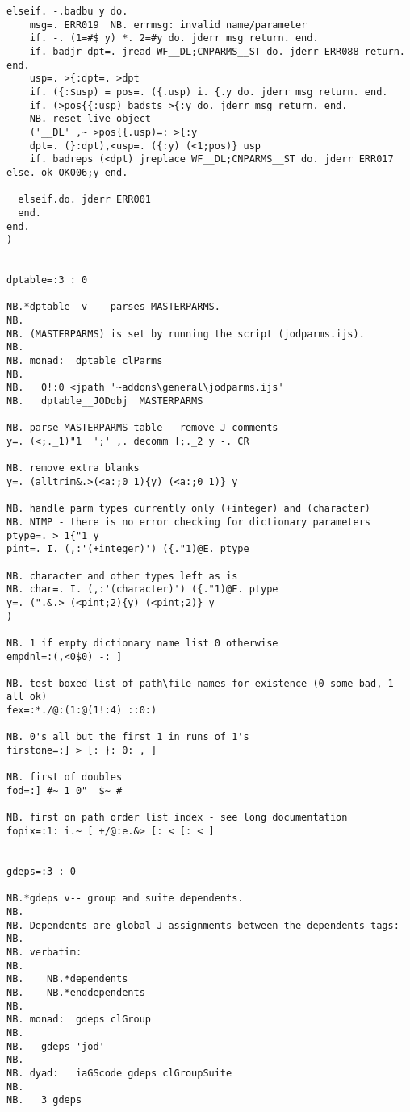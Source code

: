 \begin{lstlisting}[frame=single,framerule=0pt,basicstyle=\ttfamily\tiny]
  elseif. -.badbu y do.
    msg=. ERR019  NB. errmsg: invalid name/parameter
    if. -. (1=#$ y) *. 2=#y do. jderr msg return. end.
    if. badjr dpt=. jread WF__DL;CNPARMS__ST do. jderr ERR088 return. end.
    usp=. >{:dpt=. >dpt
    if. ({:$usp) = pos=. ({.usp) i. {.y do. jderr msg return. end.
    if. (>pos{{:usp) badsts >{:y do. jderr msg return. end.
    NB. reset live object
    ('__DL' ,~ >pos{{.usp)=: >{:y
    dpt=. (}:dpt),<usp=. ({:y) (<1;pos)} usp
    if. badreps (<dpt) jreplace WF__DL;CNPARMS__ST do. jderr ERR017 else. ok OK006;y end.

  elseif.do. jderr ERR001
  end.
end.
)


dptable=:3 : 0

NB.*dptable  v--  parses MASTERPARMS.
NB. 
NB. (MASTERPARMS) is set by running the script (jodparms.ijs).
NB.
NB. monad:  dptable clParms
NB.
NB.   0!:0 <jpath '~addons\general\jodparms.ijs'
NB.   dptable__JODobj  MASTERPARMS

NB. parse MASTERPARMS table - remove J comments
y=. (<;._1)"1  ';' ,. decomm ];._2 y -. CR

NB. remove extra blanks
y=. (alltrim&.>(<a:;0 1){y) (<a:;0 1)} y

NB. handle parm types currently only (+integer) and (character)
NB. NIMP - there is no error checking for dictionary parameters
ptype=. > 1{"1 y
pint=. I. (,:'(+integer)') ({."1)@E. ptype

NB. character and other types left as is
NB. char=. I. (,:'(character)') ({."1)@E. ptype
y=. (".&.> (<pint;2){y) (<pint;2)} y
)

NB. 1 if empty dictionary name list 0 otherwise
empdnl=:(,<0$0) -: ]

NB. test boxed list of path\file names for existence (0 some bad, 1 all ok)
fex=:*./@:(1:@(1!:4) ::0:)

NB. 0's all but the first 1 in runs of 1's
firstone=:] > [: }: 0: , ]

NB. first of doubles
fod=:] #~ 1 0"_ $~ #

NB. first on path order list index - see long documentation
fopix=:1: i.~ [ +/@:e.&> [: < [: < ]


gdeps=:3 : 0

NB.*gdeps v-- group and suite dependents.
NB.
NB. Dependents are global J assignments between the dependents tags:
NB.
NB. verbatim:
NB.
NB.    NB.*dependents
NB.    NB.*enddependents
NB.
NB. monad:  gdeps clGroup
NB.
NB.   gdeps 'jod'
NB.
NB. dyad:   iaGScode gdeps clGroupSuite
NB.
NB.   3 gdeps 


\end{lstlisting}
